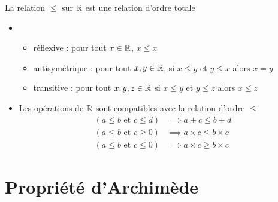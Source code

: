 \begin{frame}

\begin{proposition}[$\Rr2$]
La relation $\leq$ sur $\mathbb{R}$ est une relation d'ordre totale
\end{proposition}

\pause
\bigskip

\begin{remarque}
\begin{itemize}
\item 
\begin{itemize}
  \item réflexive : pour tout $x \in \mathbb{R}$, $x \le x$
  \item antisymétrique : pour tout $x,y \in \mathbb{R}$, si $x \le y$ et $y\le x$ alors $x=y$
  \item transitive : pour tout $x,y,z \in \mathbb{R}$ si $x\le y$ et $y\le z$ alors $x\le z$
\end{itemize}
\pause

\item	Les opérations de $\mathbb{R}$ sont compatibles avec la relation d'ordre $\leq$ 
\vspace*{-2ex}
\begin{align*}
 \left (a\leq b \text{ et } c\leq d \right) &\implies a+c\leq b+d \\
         \left (a\leq b \text{ et } c \geq 0\right)& \implies a\times c\leq b\times c \\
 \left (a\leq b \text{ et } c \leq 0\right)& \implies a\times c\geq b\times c
\end{align*}
\end{itemize}
\end{remarque}

\end{frame}

\section*{Propriété d'Archimède}

